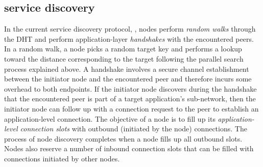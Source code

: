 
\subsection{\discv service discovery}
\label{sec:background:discv4}
In the current service discovery protocol, \discv,  nodes perform \textit{random walks} through the DHT and perform application-layer \emph{handshakes} with the encountered peers.
In a random walk, a node picks a random target key and performs a lookup toward the distance corresponding to the target following the parallel search process explained above. 
A handshake involves a secure channel establishment between the initiator node and the encountered peer and therefore incurs some overhead to both endpoints. If the initiator node discovers during the handshake that the encountered peer is part of a target application's sub-network, then the initiator node can follow up with a connection request to the peer to establish an application-level connection. The objective of a node is to fill up its \textit{application-level connection slots} with outbound (\ie initiated by the node) connections. The process of node discovery completes when a node fills up all outbound slots. Nodes also reserve a number of inbound connection slots that can be filled with connections initiated by other nodes. 

